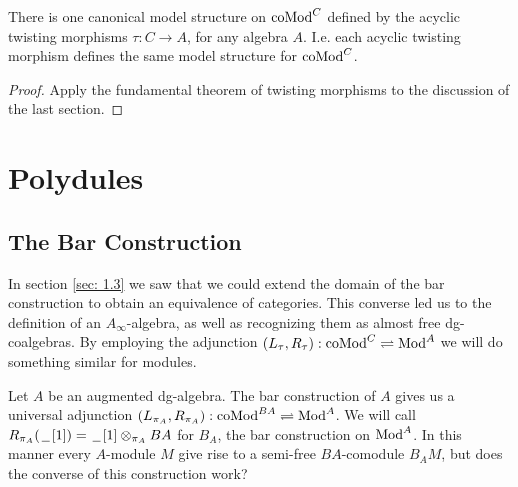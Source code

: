 \documentclass[../thesis.tex]{subfiles}
\begin{document}
            \begin{corollary}
                There is one canonical model structure on $\tt{coMod}^C$ defined by the acyclic twisting morphisms $\tau : C \rightarrow A$, for any algebra $A$. I.e. each acyclic twisting morphism defines the same model structure for $\tt{coMod}^C$. 
            \end{corollary}

            \begin{proof}
                Apply the fundamental theorem of twisting morphisms to the discussion of the last section.
            \end{proof}

    \section{Polydules}
        \subsection{The Bar Construction}
            In section \ref{sec: 1.3} we saw that we could extend the domain of the bar construction to obtain an equivalence of categories. This converse led us to the definition of an $A_\infty$-algebra, as well as recognizing them as almost free dg-coalgebras. By employing the adjunction $(L_\tau, R_\tau) : \tt{coMod}^C \rightleftharpoons \tt{Mod}^A$ we will do something similar for modules.

            Let $A$ be an augmented dg-algebra. The bar construction of $A$ gives us a universal adjunction $(L_{\pi_A}, R_{\pi_A}) : \tt{coMod}^{BA} \rightleftharpoons \tt{Mod}^A$. We will call $R_{\pi_A}(\argument [1]) = \argument [1]\otimes_{\pi_A}BA$ for $B_A$, the bar construction on $\tt{Mod}^A$. In this manner every $A$-module $M$ give rise to a semi-free $BA$-comodule $B_AM$, but does the converse of this construction work?
\end{document}
